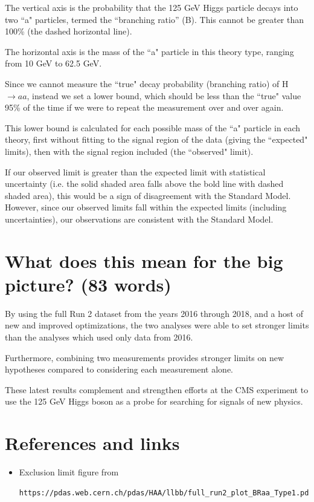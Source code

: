 \documentclass{article}
\begin{document}
The vertical axis is the probability that the 125 GeV Higgs particle decays into two ``a" particles, termed the ``branching ratio'' (B). This cannot be greater than 100\% (the dashed horizontal line). 

The horizontal axis is the mass of the ``a" particle in this theory type, ranging from 10 GeV to 62.5 GeV. 

Since we cannot measure the ``true" decay probability (branching ratio) of H $\rightarrow aa$, instead we set a lower bound, which should be less than the ``true" value 95\% of the time if we were to repeat the measurement over and over again.

This lower bound is calculated for each possible mass of the ``a" particle in each theory, first without fitting to the signal region of the data (giving the ``expected" limits), then with the signal region included (the ``observed" limit). 

If our observed limit is greater than the expected limit with statistical uncertainty (i.e. the solid shaded area falls above the bold line with dashed shaded area), this would be a sign of
disagreement with the Standard Model. However, since our observed limits fall within the expected limits (including uncertainties), our observations are consistent with the Standard Model. 


\section{What does this mean for the big picture? (83 words)}

By using the full Run 2 dataset from the years 2016 through 2018, and a host of new and improved optimizations, the two analyses were able to set stronger limits than the analyses which used only data from 2016.

Furthermore, combining two measurements provides stronger limits on new hypotheses compared to considering each measurement alone.

These latest results complement and strengthen efforts at the CMS experiment to use the 125 GeV Higgs boson as a probe for searching for signals of new physics. 



\section{References and links}

\begin{itemize}
    \item Exclusion limit figure from \begin{verbatim}https://pdas.web.cern.ch/pdas/HAA/llbb/full_run2_plot_BRaa_Type1.pdf\end{verbatim}
\end{itemize}
\end{document}
